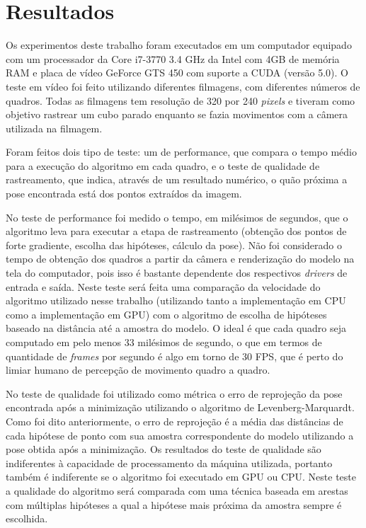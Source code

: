 \chapter{Resultados}

Os experimentos deste trabalho foram executados em um computador equipado com um processador da Core i7-3770 3.4 GHz da Intel com 4GB de memória RAM e placa de vídeo GeForce GTS 450 com suporte a CUDA (versão 5.0). O teste em vídeo foi feito utilizando diferentes filmagens, com diferentes números de quadros. Todas as filmagens tem resolução de 320 por 240 \emph{pixels} e tiveram como objetivo rastrear um cubo parado enquanto se fazia movimentos com a câmera utilizada na filmagem.

Foram feitos dois tipo de teste: um de performance, que compara o tempo médio para a execução do algoritmo em cada quadro, e o teste de qualidade de rastreamento, que indica, através de um resultado numérico, o quão próxima a pose encontrada está dos pontos extraídos da imagem.

No teste de performance foi medido o tempo, em milésimos de segundos, que o algoritmo leva para executar a etapa de rastreamento (obtenção dos pontos de forte gradiente, escolha das hipóteses, cálculo da pose). Não foi considerado o tempo de obtenção dos quadros a partir da câmera e renderização do modelo na tela do computador, pois isso é bastante dependente dos respectivos \emph{drivers} de entrada e saída. Neste teste será feita uma comparação da velocidade do algoritmo utilizado nesse trabalho (utilizando tanto a implementação em CPU como a implementação em GPU) com o algoritmo de escolha de hipóteses baseado na distância até a amostra do modelo. O ideal é que cada quadro seja computado em pelo menos 33 milésimos de segundo, o que em termos de quantidade de \emph{frames} por segundo é algo em torno de 30 FPS, que é perto do limiar humano de percepção de movimento quadro a quadro.

No teste de qualidade foi utilizado como métrica o erro de reprojeção da pose encontrada após a minimização utilizando o algoritmo de Levenberg-Marquardt. Como foi dito anteriormente, o erro de reprojeção é a média das distâncias de cada hipótese de ponto com sua amostra correspondente do modelo utilizando a pose obtida após a minimização. Os resultados do teste de qualidade são indiferentes à capacidade de processamento da máquina utilizada, portanto também é indiferente se o algoritmo foi executado em GPU ou CPU. Neste teste a qualidade do algoritmo será comparada com uma técnica baseada em arestas com múltiplas hipóteses a qual a hipótese mais próxima da amostra sempre é escolhida.

